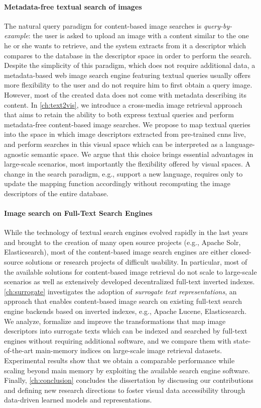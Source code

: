 \paragraph{Metadata-free textual search of images}
The natural query paradigm for content-based image searches is \emph{query-by-example}:
the user is asked to upload an image with a content similar to the one he or she wants to retrieve, and the system extracts from it a descriptor which compares to the database in the descriptor space in order to perform the search.
Despite the simplicity of this paradigm, which does not require additional data, a metadata-based web image search engine featuring textual queries usually offers more flexibility to the user and do not require him to first obtain a query image.
However, most of the created data does not come with metadata describing its content.
In \ref{ch:text2vis}, we introduce a cross-media image retrieval approach that aims to retain the ability to both express textual queries and perform metadata-free content-based image searches.
We propose to map textual queries into the space in which image descriptors extracted from pre-trained \glspl{cnn} live, and perform searches in this visual space which can be interpreted as a language-agnostic semantic space.
We argue that this choice brings essential advantages in large-scale scenarios, most importantly the flexibility offered by visual spaces.
A change in the search paradigm, e.g., support a new language, requires only to update the mapping function accordingly without recomputing the image descriptors of the entire database.

\paragraph{Image search on Full-Text Search Engines}
While the technology of textual search engines evolved rapidly in the last years and brought to the creation of many open source projects (e.g., Apache Solr, Elasticsearch), most of the content-based image search engines are either closed-source solutions or research projects of difficult usability.
In particular, most of the available solutions for content-based image retrieval do not scale to large-scale scenarios as well as extensively developed decentralized full-text inverted indexes.
\ref{ch:surrogate} investigates the adoption of \emph{surrogate text representations}, an approach that enables content-based image search on existing full-text search engine backends based on inverted indexes, e.g., Apache Lucene, Elasticsearch.
We analyze, formalize and improve the transformations that map image descriptors into surrogate texts which can be indexed and searched by full-text engines without requiring additional software, and we compare them with state-of-the-art main-memory indices on large-scale image retrieval datasets.
Experimental results show that we obtain a comparable performance while scaling beyond main memory by exploiting the available search engine software.\\

Finally, \ref{ch:conclusion} concludes the dissertation by discussing our contributions and defining new research directions to foster visual data accessibility through data-driven learned models and representations.
